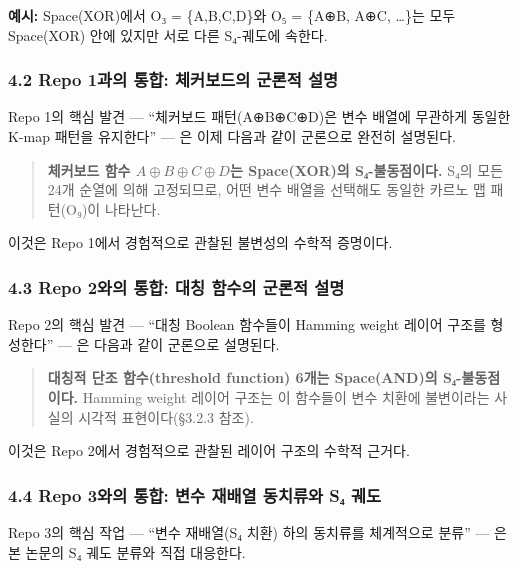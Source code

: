 \documentclass[
]{article}
\begin{document}
\textbf{예시:} Space(XOR)에서 O₃ = \{A,B,C,D\}와 O₅ = \{A⊕B, A⊕C,
\ldots\}는 모두 Space(XOR) 안에 있지만 서로 다른 S₄-궤도에 속한다.

\subsubsection{4.2 Repo 1과의 통합: 체커보드의 군론적
설명}\label{repo-1uxacfcuxc758-uxd1b5uxd569-uxccb4uxcee4uxbcf4uxb4dcuxc758-uxad70uxb860uxc801-uxc124uxba85}

Repo 1의 핵심 발견 --- ``체커보드 패턴(A⊕B⊕C⊕D)은 변수 배열에 무관하게
동일한 K-map 패턴을 유지한다'' --- 은 이제 다음과 같이 군론으로 완전히
설명된다.

\begin{quote}
\textbf{체커보드 함수 \(A \oplus B \oplus C \oplus D\)는 Space(XOR)의
S₄-불동점이다.} S₄의 모든 24개 순열에 의해 고정되므로, 어떤 변수 배열을
선택해도 동일한 카르노 맵 패턴(O₉)이 나타난다.
\end{quote}

이것은 Repo 1에서 경험적으로 관찰된 불변성의 수학적 증명이다.

\subsubsection{4.3 Repo 2와의 통합: 대칭 함수의 군론적
설명}\label{repo-2uxc640uxc758-uxd1b5uxd569-uxb300uxce6d-uxd568uxc218uxc758-uxad70uxb860uxc801-uxc124uxba85}

Repo 2의 핵심 발견 --- ``대칭 Boolean 함수들이 Hamming weight 레이어
구조를 형성한다'' --- 은 다음과 같이 군론으로 설명된다.

\begin{quote}
\textbf{대칭적 단조 함수(threshold function) 6개는 Space(AND)의
S₄-불동점이다.} Hamming weight 레이어 구조는 이 함수들이 변수 치환에
불변이라는 사실의 시각적 표현이다(§3.2.3 참조).
\end{quote}

이것은 Repo 2에서 경험적으로 관찰된 레이어 구조의 수학적 근거다.

\subsubsection{4.4 Repo 3와의 통합: 변수 재배열 동치류와 S₄
궤도}\label{repo-3uxc640uxc758-uxd1b5uxd569-uxbcc0uxc218-uxc7acuxbc30uxc5f4-uxb3d9uxce58uxb958uxc640-sux2084-uxada4uxb3c4}

Repo 3의 핵심 작업 --- ``변수 재배열(S₄ 치환) 하의 동치류를 체계적으로
분류'' --- 은 본 논문의 S₄ 궤도 분류와 직접 대응한다.
\end{document}
